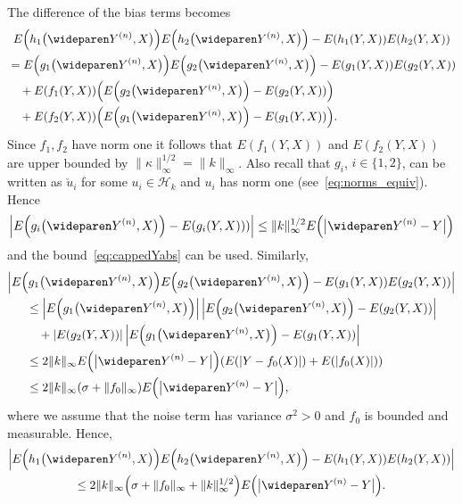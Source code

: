 \documentclass[10pt]{amsart}
\theoremstyle{definition}\newtheorem{defi}[theo]{Definition}\newtheorem{rema}[theo]{Remark}\newtheorem{exam}[theo]{Example}\newtheorem{exem}[theo]{Example}\newtheorem{nota}[theo]{Notation}
\theoremstyle{remark}
\newcommand{\cH}{\mathcal{H}}
\let\originalleft\left
\let\originalright\right
\renewcommand{\left}{\mathopen{}\mathclose\bgroup\originalleft}
\renewcommand{\right}{\aftergroup\egroup\originalright}
\begin{document}
The difference of the bias terms becomes
\begin{multline*}
E\left(h_1\bigl(\wideparen Y^{(n)},X\bigr)\right) E\left(h_2\bigl(\wideparen Y^{(n)},X\bigr)\right) - E(h_1(Y,X)) E(h_2(Y,X)) \\
\begin{aligned}
&= E\left(g_1 \bigl(\wideparen Y^{(n)},X\bigr)\right) E\left(g_2\bigl(\wideparen Y^{(n)},X\bigr)\right) - E(g_1 (Y,X)) E(g_2(Y,X))\\
&\quad+ E(f_1(Y,X)) \left(E\left(g_2\bigl(\wideparen Y^{(n)},X\bigr)\right) - E(g_2(Y,X))\right)\\
&\quad+ E(f_2(Y,X)) \left(E\left(g_1\bigl(\wideparen Y^{(n)},X\bigr)\right) - E(g_1(Y,X))\right).
\end{aligned}
\end{multline*}
Since $f_1,f_2$ have norm one it follows that $E(f_1(Y,X))$ and $E(f_2(Y,X))$ are upper bounded by $\|\kappa\|_\infty^{1/2} = \|k\|_\infty$. Also recall that $g_i$, $i\in \{1,2\}$, can be written as $\check{u}_i$ for some $u_i \in \cH_k$ and $u_i$ has norm one (see~\eqref{eq:norms_equiv}). Hence
\[
\left|E\left(g_i\bigl(\wideparen Y^{(n)},X\bigr)\right) - E(g_i(Y,X)))\right| \leq \|k\|_\infty^{1/2} E\left(\bigl|\wideparen Y^{(n)} - Y\bigr|\right)
\]
and the bound~\eqref{eq:cappedYabs} can be used. Similarly,
\begin{multline*}
\left|E\left(g_1 \bigl(\wideparen Y^{(n)},X\bigr)\right) E\left(g_2\bigl(\wideparen Y^{(n)},X\bigr)\right) - E(g_1 (Y,X)) E(g_2(Y,X))\right|\\
\begin{aligned}
&\leq \left|E\left(g_1\bigl(\wideparen Y^{(n)},X\bigr)\right)\right| \, \left|E\left(g_2\bigl(\wideparen Y^{(n)},X\bigr)\right) - E(g_2(Y,X))\right| \\
&\quad + |E(g_2 (Y,X))| \, \left|E\left(g_1\bigl(\wideparen Y^{(n)},X\bigr)\right) - E(g_1(Y,X))\right| \\
&\leq 2 \|k\|_\infty E\left(\bigl|\wideparen Y^{(n)} - Y\bigr|\right) (E(|Y- f_0(X)|) + E(|f_0(X)|)) \\
&\leq 2 \|k\|_\infty (\sigma + \|f_0\|_\infty) E\left(\bigl|\wideparen Y^{(n)} - Y\bigr|\right),
\end{aligned}
\end{multline*}
where we assume that the noise term has variance $\sigma^2 > 0$ and $f_0$ is bounded and measurable. Hence,
\begin{multline*}
\left|E\left(h_1\bigl(\wideparen Y^{(n)},X\bigr)\right) E\left(h_2\bigl(\wideparen Y^{(n)},X\bigr)\right) - E(h_1(Y,X)) E(h_2(Y,X))\right| \\
\leq 2 \|k\|_\infty \left(\sigma + \|f_0\|_\infty +\|k\|_\infty^{1/2}\right) E\left(\bigl|\wideparen Y^{(n)} - Y\bigr|\right).
\end{multline*}
\end{document}
